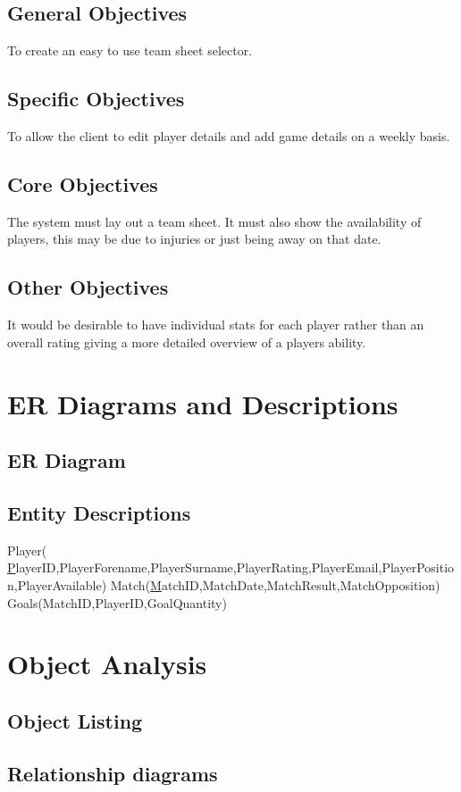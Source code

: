 \subsection{General Objectives}
To create an easy to use team sheet selector.
\subsection{Specific Objectives}
To allow the client to edit player details and add game details on a weekly basis.
\subsection{Core Objectives}
The system must lay out a team sheet. It must also show the availability of players, this may be due to injuries or just being away on that date.     
\subsection{Other Objectives}
It would be desirable to have individual stats for each player rather than an overall rating giving a more detailed overview of a players ability.
\section{ER Diagrams and Descriptions}

\subsection{ER Diagram}


\subsection{Entity Descriptions}
Player( {\ul PlayerID},PlayerForename,PlayerSurname,PlayerRating,PlayerEmail,PlayerPosition,PlayerAvailable)
Match({\ul MatchID},MatchDate,MatchResult,MatchOpposition)
Goals(MatchID,PlayerID,GoalQuantity)
\section{Object Analysis}

\subsection{Object Listing}

\subsection{Relationship diagrams}

